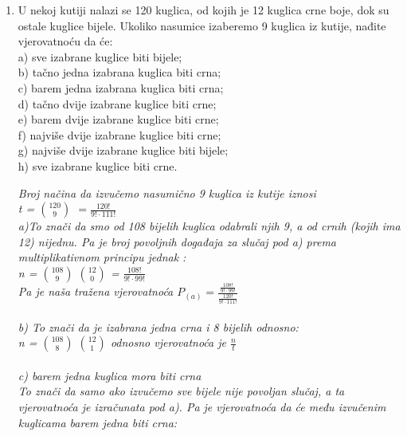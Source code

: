\documentclass[12pt]{article}
\begin{document}
\begin{enumerate}
\begin{center}
	    \end{center}
		\item U nekoj kutiji nalazi se 120 kuglica, od kojih je 12 kuglica crne boje, dok su ostale kuglice bijele. Ukoliko nasumice izaberemo 9 kuglica iz kutije, nađite vjerovatnoću da će:\\
a) sve izabrane kuglice biti bijele;\\
b) tačno jedna izabrana kuglica biti crna;\\
c) barem jedna izabrana kuglica biti crna;\\
d) tačno dvije izabrane kuglice biti crne;\\
e) barem dvije izabrane kuglice biti crne;\\
f) najviše dvije izabrane kuglice biti crne;\\
g) najviše dvije izabrane kuglice biti bijele;\\
h) sve izabrane kuglice biti crne.
		\begin{center}
		\textit{
		Broj načina da izvučemo nasumično 9 kuglica iz kutije iznosi\\
		t = $120 \choose 9$ $= \frac{120!}{9!\cdot111!}$\\
		\vspace{0.15cm}
		a)To znači da smo od 108 bijelih kuglica odabrali njih 9, a od crnih (kojih ima 12) nijednu. Pa je broj povoljnih događaja za slučaj pod a) prema multiplikativnom principu jednak :\\ n = $108 \choose 9$ $12\choose0$ = $\frac{108!}{9!\cdot99!}$\\
		Pa je naša tražena vjerovatnoća $P_{(a)}=\frac{\frac{108!}{9!\cdot99!}}{\frac{120!}{9!\cdot111!}}$\\
		\\ \vspace{0.15cm}
		b) To znači da je izabrana jedna crna i 8 bijelih odnosno:\\
		n = $108 \choose 8$ $12\choose1$ odnosno vjerovatnoća je $\frac{n}{t}$ \\ \vspace{0.15cm}
		 \\ \vspace{0.15cm}
		c) barem jedna kuglica mora biti crna\\
		To znači da samo ako izvučemo sve bijele nije povoljan slučaj, a ta vjerovatnoća je izračunata pod a). Pa je vjerovatnoća da će među izvučenim kuglicama barem jedna biti crna: \\
}
\end{center}
\end{enumerate}
\end{document}
